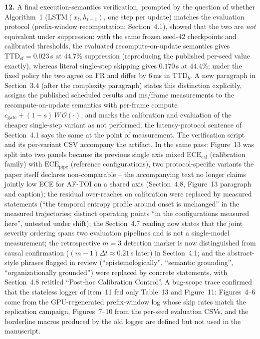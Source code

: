 \documentclass[1p,12pt,authoryear]{elsarticle}
\begin{document}
\vspace{2mm}
\noindent \textbf{12.} A final execution-semantics verification, prompted by the question of whether Algorithm~1 ($\mathrm{LSTM}(x_t, h_{t-1})$, one step per update) matches the evaluation protocol (prefix-window recomputation; Section~4.1), showed that the two are \emph{not} equivalent under suppression: with the same frozen seed-42 checkpoints and calibrated thresholds, the evaluated recompute-on-update semantics gives $\mathrm{TTD}_{\mathrm{ef}} = 0.023$\,s at $44.7\%$ suppression (reproducing the published per-seed value exactly), whereas literal single-step skipping gives $0.170$\,s at $44.4\%$; under the fixed policy the two agree on FR and differ by $6$\,ms in $\mathrm{TTD}_b$. A new paragraph in Section~3.4 (after the complexity paragraph) states this distinction explicitly, assigns the published scheduled results and ms/frame measurements to the recompute-on-update semantics with per-frame compute $c_{\mathrm{gate}} + (1-s)\,W\,\mathcal{O}(\cdot)$, and marks the calibration and evaluation of the cheaper single-step variant as not performed; the latency-protocol sentence of Section~4.1 says the same at the point of measurement. The verification script and its per-variant CSV accompany the artifact. In the same pass: Figure~13 was split into two panels because its previous single axis mixed $\mathrm{ECE}_{\mathrm{cal}}$ (calibration family) with $\mathrm{ECE}_{\mathrm{pipe}}$ (reference configurations), two protocol-specific variants the paper itself declares non-comparable -- the accompanying text no longer claims jointly low ECE for AF-TOI on a shared axis (Section~4.8, Figure~13 paragraph and caption); the residual over-reaches on calibration were replaced by measured statements (``the temporal entropy profile around onset is unchanged'' in the measured trajectories; distinct operating points ``in the configurations measured here'', untested under shift); the Section~4.7 reading now states that the joint severity ordering spans two evaluation pipelines and is not a single-model measurement; the retrospective $m{=}3$ detection marker is now distinguished from causal confirmation ($(m{-}1)\Delta t \approx 0.21$\,s later) in Section~4.1; and the abstract-style phrases flagged in review (``epistemologically'', ``semantic grounding'', ``organizationally grounded'') were replaced by concrete statements, with Section~4.8 retitled ``Post-hoc Calibration Control''. A bug-scope trace confirmed that the stateless logger of item~11 fed only Table~13 and Figure~11: Figures~4--6 come from the GPU-regenerated prefix-window log whose skip rates match the replication campaign, Figures~7--10 from the per-seed evaluation CSVs, and the borderline macros produced by the old logger are defined but not used in the manuscript.
\end{document}
